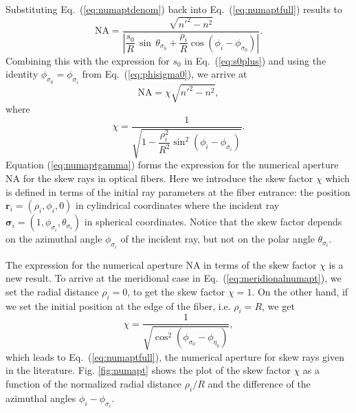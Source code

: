 \documentclass[a4paper,twocolumn,superscriptaddress]{revtex4-1}
\begin{document}
{Substituting Eq.~(\ref{eq:numaptdenom}) back into Eq.~(\ref{eq:numaptfull}) results to
\begin{equation}
\mathrm{NA} =  \dfrac{\displaystyle \sqrt{n'^2 - n^2}}{\left |
\dfrac{s_0}{R}\, \sin\, \theta_{ \sigma_0 } + \dfrac{\rho_i}{R} \cos (\phi_i - \phi_{ \sigma_0 })
\right |} .
\end{equation}
Combining this with the expression for $s_0$ in Eq.~(\ref{eq:s0plus})
and using the identity $\phi_{ \sigma_0 } = \phi_{ \sigma_i }$ from Eq.~(\ref{eq:phisigma0}),
we arrive at
\begin{equation}
\label{eq:numaptgamma}
\mathrm{NA} = 
\chi \sqrt{n'^2 - n^2} ,
\end{equation}
where
\begin{equation}
\label{eq:chi}
\chi = \dfrac{1}{
{\sqrt{ 1 - \dfrac{\rho_i^2}{R^2} \sin^2 (\phi_i - \phi_{ \sigma_i }) }
}} .
\end{equation}
Equation (\ref{eq:numaptgamma}) forms the expression for the numerical aperture NA for the skew rays in optical fibers. 
Here we introduce the skew factor $\chi$ which is defined in terms of the initial ray parameters at the fiber entrance: the position $\mathbf r_i = (\rho_i, \phi_i, 0)$ in cylindrical coordinates where the incident ray $\bm \sigma_i = (1, \phi_{ \sigma_i }, \theta_{\sigma_i})$ in spherical coordinates. Notice that the skew factor depends on the azimuthal angle $\phi_{ \sigma_i }$ of the incident ray, but not on the polar angle $\theta_{\sigma_i}$.

The expression for the numerical aperture NA in terms of the skew factor $\chi$ is a new result.
To arrive at the meridional case in Eq.~(\ref{eq:meridionalnumapt}), we set the radial distance $\rho_i = 0$, to get the skew factor $\chi = 1$. 
On the other hand, if we set the initial position at the edge of the fiber, i.e. $\rho_i = R$, we get 
\begin{equation}
\chi=
\dfrac{1}{\sqrt{\cos^2 (\phi_{ \sigma_0 } - \phi_{ \eta_0 })}} ,
\end{equation}
which leads to Eq.~(\ref{eq:numaptfull}), the numerical aperture for skew rays given in the literature. Fig. \ref{fig:numapt} shows the plot of the skew factor $\chi$ as a function of the normalized radial distance $\rho_i/R$ and the difference of the azimuthal angles  $\phi_i - \phi_{ \sigma_i }$.

}
\end{document}
